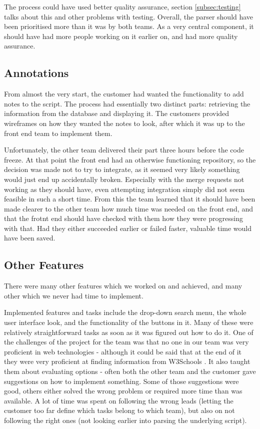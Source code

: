 \documentclass{l3proj}
\begin{document}
The process could have used better quality assurance, section  \ref{subsec:testing} talks about this and other problems with testing. Overall, the parser should have been prioritised more than it was by both teams. As a very central component, it should have had more people working on it earlier on, and had more quality assurance.


\subsection{Annotations}
\label{subsec:annotations}
From almost the very start, the customer had wanted the functionality to add notes to the script. The process had essentially two distinct parts: retrieving the information from the database and displaying it.
The customers provided wireframes on how they wanted the notes to look, after which it was up to the front end team to implement them. 

Unfortunately, the other team delivered their part three hours before the code freeze. At that point the front end had an otherwise functioning repository, so the decision was made not to try to integrate, as it seemed very likely something would just end up accidentally broken. Especially with the merge requests not working as they should have, even attempting integration simply did not seem feasible in such a short time.
From this the team learned that it should have been made clearer to the other team how much time was needed on the front end, and that the frotnt end should have checked with them how they were progressing with that. Had they either succeeded earlier or failed faster, valuable time would have been saved.


\subsection{Other Features}

There were many other features which we worked on and achieved, and many other which we never had time to implement.

Implemented features and tasks include the drop-down search menu, the whole user interface look, and the functionality of the buttons in it. Many of these were relatively straightforward tasks as soon as it was figured out how to do it. One of the challenges of the project for the team was that no one in our team was very proficient in web technologies - although it could be said that at the end of it they were very proficient at finding information from W3Schools \cite{w3schools}. It also taught them about evaluating options - often both the other team and the customer gave suggestions on how to implement something. Some of those suggestions were good, others either solved the wrong problem or required more time than was available. A lot of time was spent on following the wrong leads (letting the customer too far define which tasks belong to which team), but also on not following the right ones (not looking earlier into parsing the underlying script). 
\end{document}
